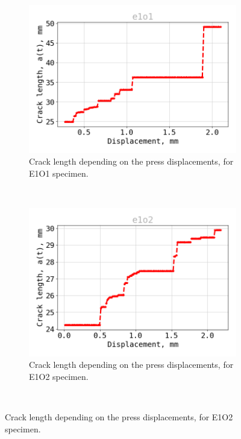 \begin{figure}[H]
	\centering
\begin{subfigure}{0.48\linewidth}
	\centering
	\includegraphics[width=\textwidth]{Figures/e1o1_a}
	\decoRule
	\caption[Crack length E1O1]{Crack length depending on the press displacements, for E1O1 specimen.}
	\label{fig:E1O1_a}
\end{subfigure}
\hfill \\
\begin{subfigure}{0.48\linewidth}
	\centering
	\includegraphics[width=\textwidth]{Figures/e1o2_a}
	\decoRule
	\caption[Crack length E1O2]{Crack length depending on the press displacements, for E1O2 specimen.}
	\label{fig:E1O2_a}
\end{subfigure}
\hfill\\

\end{figure}
